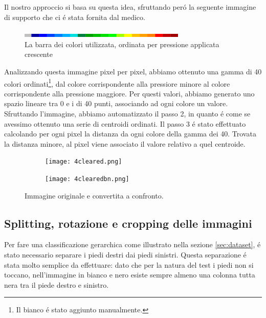 \documentclass[11pt,twoside,a4paper]{article}
\begin{document}
Il nostro approccio si basa su questa idea, sfruttando per\'o la seguente immagine di supporto che ci \'e stata fornita dal medico.
\begin{figure}
\centering
\includegraphics[keepaspectratio, width=300px]{color.png}
\caption{La barra dei colori utilizzata, ordinata per pressione applicata crescente}
\end{figure}
Analizzando questa immagine pixel per pixel, abbiamo ottenuto una gamma di 40 colori ordinati\footnote{Il bianco \'e stato aggiunto manualmente.}, dal colore corrispondente alla pressiore minore al colore corrispondente alla pressione maggiore. Per questi valori, abbiamo generato uno spazio lineare tra 0 e i di 40 punti, associando ad ogni colore un valore. Sfruttando l'immagine, abbiamo automatizzato il passo 2, in quanto \'e come se avessimo ottenuto una serie di centroidi ordinati. Il passo 3 \'e stato effettuato calcolando per ogni pixel la distanza da ogni colore della gamma dei 40. Trovata la distanza minore, al pixel viene associato il valore relativo a quel centroide.

\begin{figure}
\centering
\begin{subfigure}{.4\textwidth}
\texttt{[image: 4cleared.png]}
\end{subfigure}
\begin{subfigure}{.4\textwidth}
\texttt{[image: 4clearedbn.png]}
\end{subfigure}
\caption{Immagine originale e convertita a confronto.}
\end{figure}




\subsection{Splitting, rotazione e cropping delle immagini}
\label{subsec:splitting}
Per fare una classificazione gerarchica come illustrato nella sezione \ref{sec:dataset}, \'e stato necessario separare i piedi destri dai piedi sinistri. Questa separazione \'e stata molto semplice da effettuare: dato che per la natura del test i piedi non si toccano, nell'immagine in bianco e nero esiste sempre almeno una colonna tutta nera tra il piede destro e sinistro. 
\end{document}
